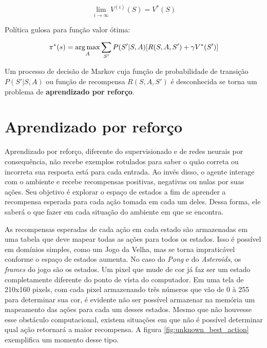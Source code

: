 \begin{equation} \label{eq:qvalue}
\lim_{i\to\infty} V^{(i)}(S) = V^{*}(S)
\end{equation}

Política gulosa para função valor ótima:

\begin{equation} \label{eq:opt_pol}
\pi^{*}(s) = \operatorname*{arg\,max}_{A}\sum_{S'}P(S'|S,A)[R(S,A,S') + \gamma V^{*}(S')]
\end{equation}

Um processo de decisão de Markov cuja função de probabilidade de transição $P(S'|S,A)$ ou função de recompensa $R(S,A,S')$ é desconhecida se torna um problema de \textbf{aprendizado por reforço}.


\section{Aprendizado por reforço}
\label{sec:rl}

Aprendizado por reforço, diferente do supervisionado e de redes neurais por consequência, não recebe exemplos rotulados para saber o quão correta ou incorreta sua resposta está para cada entrada.
Ao invés disso, o agente interage com o ambiente e recebe recompensas positivas, negativas ou nulas por suas ações.
Seu objetivo é explorar o espaço de estados a fim de aprender a recompensa esperada para cada ação tomada em cada um deles.
Dessa forma, ele saberá o que fazer em cada situação do ambiente em que se encontra.

As recompensas esperadas de cada ação em cada estado são armazenadas em uma tabela que deve mapear todas as ações para todos os estados.
Isso é possível em domínios simples, como um Jogo da Velha, mas se torna impraticável conforme o espaço de estados aumenta.
No caso do \textit{Pong} e do \textit{Asteroids}, os \textit{frames} do jogo são os estados.
Um pixel que mude de cor já faz ser um estado completamente diferente do ponto de vista do computador.
Em uma tela de 210x160 pixels, com cada pixel armazenando três números que vão de 0 à 255 para determinar sua cor, é evidente não ser possível armazenar na memória um mapeamento das ações para cada um desses estados.
Mesmo que não houvesse esse obstáculo computacional, existem situações em que não é possível determinar qual ação retornará a maior recompensa. A figura \ref{fig:unknown_best_action} exemplifica um momento desse tipo.

